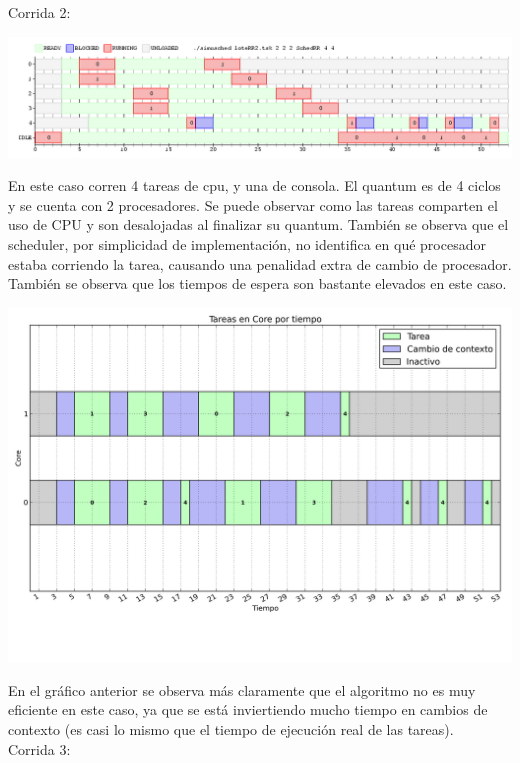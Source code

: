 \noindent
Corrida 2:


\begin{center}
\includegraphics[scale=0.4]{graficos/rr2.png}
\end{center}

En este caso corren 4 tareas de cpu, y una de consola. El quantum es de 4 ciclos y se cuenta con 2 procesadores. Se puede observar como las tareas comparten el uso de CPU y son desalojadas al finalizar su quantum. También se observa que el scheduler, por simplicidad de implementación, no identifica en qué procesador estaba corriendo la tarea, causando una penalidad extra de cambio de procesador. También se observa que los tiempos de espera son bastante elevados en este caso.

\begin{center}
\includegraphics[scale=0.4]{graficos/out_cores_timeline.png}
\end{center}

En el gráfico anterior se observa más claramente que el algoritmo no es muy eficiente en este caso, ya que se está inviertiendo mucho tiempo en cambios de contexto (es casi lo mismo que el tiempo de ejecución real de las tareas).\\

\noindent
Corrida 3:


